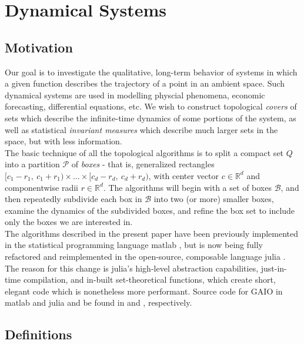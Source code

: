 \section{Dynamical Systems}


\subsection{Motivation}\label{sec:mot}

Our goal is to investigate the qualitative, long-term behavior of systems in which a given 
function describes the trajectory of a point in an ambient space. Such dynamical systems 
are used in modelling physcial phenomena, economic forecasting, differential equations, etc. 
We wish to construct topological \emph{covers} of sets which describe the infinite-time 
dynamics of some portions of the system, as well as statistical \emph{invariant measures} 
which describe much larger sets in the space, but with less information. \\

The basic technique of all the topological algorithms is to split a compact set $Q$ into 
a partition $\mathcal{P}$ of \emph{boxes} - that is, generalized rectangles
$[c_1 - r_1,\ c_1 + r_1) \times \ldots \times [c_d - r_d,\ c_d + r_d)$, with 
center vector $c \in \mathbb{R}^d$ and componentwise radii $r \in \mathbb{R}^d$. 
The algorithms will begin with a set of boxes 
$\mathcal{B}$, and then repeatedly subdivide each box in $\mathcal{B}$ into two (or more) 
smaller boxes, examine the dynamics of the subdivided boxes, and refine the box set to 
include only the boxes we are interested in. \\

The algorithms described in the present paper have been previously implemented in the 
statistical programming language matlab \cite*{matlab}, but is now being fully refactored and
reimplemented in the open-source, composable language julia \cite*{julia}. The reason for this 
change is julia's high-level abstraction capabilities, just-in-time compilation, and 
in-built set-theoretical functions, which create short, elegant code which is nonetheless 
more performant. Source code for GAIO in matlab and julia and be 
found in \cite*{oldGAIO} and \cite*{GAIO}, respectively.

\subsection{Definitions}

